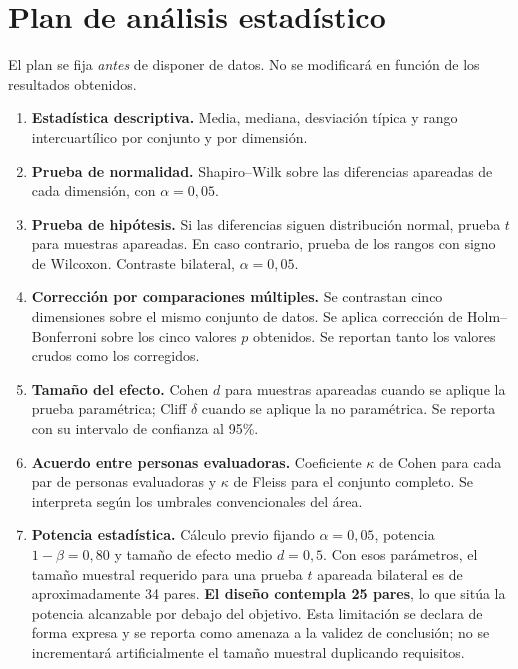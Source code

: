 \documentclass[11pt,a4paper]{article}
\begin{document}
\section{Plan de análisis estadístico}

El plan se fija \emph{antes} de disponer de datos. No se modificará en función de los resultados
obtenidos.

\begin{enumerate}[leftmargin=1.8em]
  \item \textbf{Estadística descriptiva.} Media, mediana, desviación típica y rango intercuartílico
        por conjunto y por dimensión.

  \item \textbf{Prueba de normalidad.} Shapiro--Wilk sobre las diferencias apareadas de cada
        dimensión, con $\alpha = 0{,}05$.

  \item \textbf{Prueba de hipótesis.} Si las diferencias siguen distribución normal, prueba $t$ para
        muestras apareadas. En caso contrario, prueba de los rangos con signo de Wilcoxon.
        Contraste bilateral, $\alpha = 0{,}05$.

  \item \textbf{Corrección por comparaciones múltiples.} Se contrastan cinco dimensiones sobre el
        mismo conjunto de datos. Se aplica corrección de Holm--Bonferroni sobre los cinco valores
        $p$ obtenidos. Se reportan tanto los valores crudos como los corregidos.

  \item \textbf{Tamaño del efecto.} Cohen $d$ para muestras apareadas cuando se aplique la prueba
        paramétrica; Cliff $\delta$ cuando se aplique la no paramétrica. Se reporta con su intervalo
        de confianza al 95\%.

  \item \textbf{Acuerdo entre personas evaluadoras.} Coeficiente $\kappa$ de Cohen para cada par de
        personas evaluadoras y $\kappa$ de Fleiss para el conjunto completo. Se interpreta según los
        umbrales convencionales del área.

  \item \textbf{Potencia estadística.} Cálculo previo fijando $\alpha = 0{,}05$, potencia
        $1-\beta = 0{,}80$ y tamaño de efecto medio $d = 0{,}5$. Con esos parámetros, el tamaño
        muestral requerido para una prueba $t$ apareada bilateral es de aproximadamente 34 pares.
        \textbf{El diseño contempla 25 pares}, lo que sitúa la potencia alcanzable por debajo del
        objetivo. Esta limitación se declara de forma expresa y se reporta como amenaza a la validez
        de conclusión; no se incrementará artificialmente el tamaño muestral duplicando requisitos.
\end{enumerate}
\end{document}
